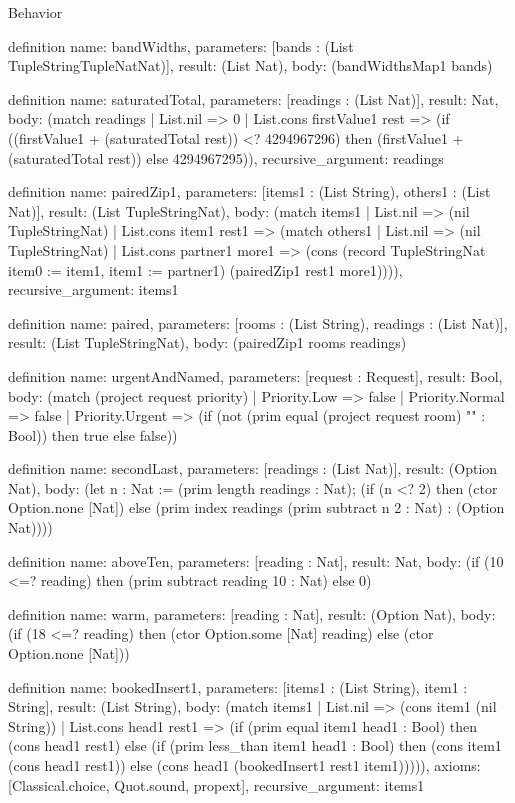\begin{lexlean}{Behavior}
\begin{semanticmodule}
definition{
  name: bandWidths,
  parameters: [bands : (List TupleStringTupleNatNat)],
  result: (List Nat),
  body: (bandWidthsMap1 bands)
}

definition{
  name: saturatedTotal,
  parameters: [readings : (List Nat)],
  result: Nat,
  body: (match readings
    | List.nil => 0
    | List.cons firstValue1 rest => (if ((firstValue1 + (saturatedTotal rest)) <? 4294967296) then (firstValue1 + (saturatedTotal rest)) else 4294967295)),
  recursive_argument: readings
}

definition{
  name: pairedZip1,
  parameters: [items1 : (List String), others1 : (List Nat)],
  result: (List TupleStringNat),
  body: (match items1
    | List.nil => (nil TupleStringNat)
    | List.cons item1 rest1 => (match others1
      | List.nil => (nil TupleStringNat)
      | List.cons partner1 more1 => (cons (record TupleStringNat {item0 := item1, item1 := partner1}) (pairedZip1 rest1 more1)))),
  recursive_argument: items1
}

definition{
  name: paired,
  parameters: [rooms : (List String), readings : (List Nat)],
  result: (List TupleStringNat),
  body: (pairedZip1 rooms readings)
}

definition{
  name: urgentAndNamed,
  parameters: [request : Request],
  result: Bool,
  body: (match (project request priority)
    | Priority.Low => false
    | Priority.Normal => false
    | Priority.Urgent => (if (not (prim equal (project request room) "" : Bool)) then true else false))
}

definition{
  name: secondLast,
  parameters: [readings : (List Nat)],
  result: (Option Nat),
  body: (let n : Nat := (prim length readings : Nat); (if (n <? 2) then (ctor Option.none [Nat]) else (prim index readings (prim subtract n 2 : Nat) : (Option Nat))))
}

definition{
  name: aboveTen,
  parameters: [reading : Nat],
  result: Nat,
  body: (if (10 <=? reading) then (prim subtract reading 10 : Nat) else 0)
}

definition{
  name: warm,
  parameters: [reading : Nat],
  result: (Option Nat),
  body: (if (18 <=? reading) then (ctor Option.some [Nat] reading) else (ctor Option.none [Nat]))
}

definition{
  name: bookedInsert1,
  parameters: [items1 : (List String), item1 : String],
  result: (List String),
  body: (match items1
    | List.nil => (cons item1 (nil String))
    | List.cons head1 rest1 => (if (prim equal item1 head1 : Bool) then (cons head1 rest1) else (if (prim less_than item1 head1 : Bool) then (cons item1 (cons head1 rest1)) else (cons head1 (bookedInsert1 rest1 item1))))),
  axioms: [Classical.choice, Quot.sound, propext],
  recursive_argument: items1
}


\end{semanticmodule}
\end{lexlean}
